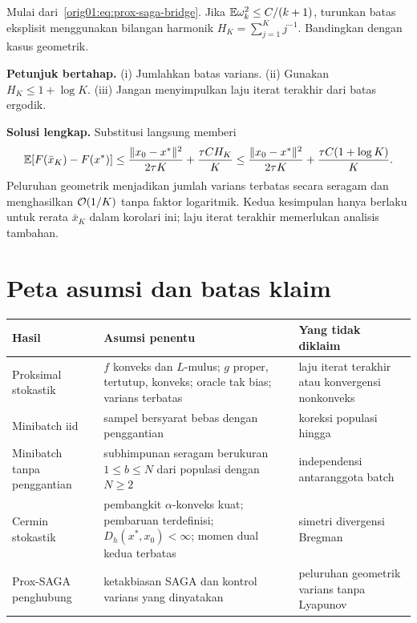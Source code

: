 \begin{exercise}
  \label{orig01:exercise:prox-saga-decay}
  Mulai dari~\eqref{orig01:eq:prox-saga-bridge}. Jika
  $\mathbb{E}\omega_k^2\leq C/(k+1)$, turunkan batas eksplisit menggunakan bilangan
  harmonik $H_K=\sum_{j=1}^{K}j^{-1}$. Bandingkan dengan kasus geometrik.

  \textbf{Petunjuk bertahap.}
  (i) Jumlahkan batas varians.
  (ii) Gunakan $H_K\leq1+\log K$.
  (iii) Jangan menyimpulkan laju iterat terakhir dari batas ergodik.

  \textbf{Solusi lengkap.}
  Substitusi langsung memberi
  \begin{equation}
    \mathbb{E}[F(\bar x_K)-F(x^*)]
    \leq\frac{\|x_0-x^*\|^2}{2\tau K}
    +\frac{\tau C H_K}{K}
    \leq\frac{\|x_0-x^*\|^2}{2\tau K}
    +\frac{\tau C(1+\log K)}{K}.
  \end{equation}
  Peluruhan geometrik menjadikan jumlah varians terbatas secara seragam dan
  menghasilkan $\mathcal{O}(1/K)$ tanpa faktor logaritmik. Kedua kesimpulan hanya
  berlaku untuk rerata $\bar x_K$ dalam korolari ini; laju iterat terakhir
  memerlukan analisis tambahan.
\end{exercise}

\section{Peta asumsi dan batas klaim}
\label{orig01:section:assumption-map}

\begin{center}
\begin{tabular}{p{}p{}p{}}
\hline
Hasil & Asumsi penentu & Yang tidak diklaim\\
\hline
Proksimal stokastik & $f$ konveks dan $L$-mulus; $g$ proper, tertutup,
konveks; oracle tak bias; varians terbatas & laju iterat terakhir atau
konvergensi nonkonveks\\
Minibatch iid & sampel bersyarat bebas dengan penggantian & koreksi populasi
hingga\\
Minibatch tanpa penggantian & subhimpunan seragam berukuran
$1\leq b\leq N$ dari populasi dengan $N\geq2$ &
independensi antaranggota batch\\
Cermin stokastik & pembangkit $\alpha$-konveks kuat; pembaruan terdefinisi;
$D_h(x^*,x_0)<\infty$; momen dual kedua terbatas & simetri divergensi
Bregman\\
Prox-SAGA penghubung & ketakbiasan SAGA dan kontrol varians yang dinyatakan &
peluruhan geometrik varians tanpa Lyapunov\\
\hline
\end{tabular}
\end{center}

